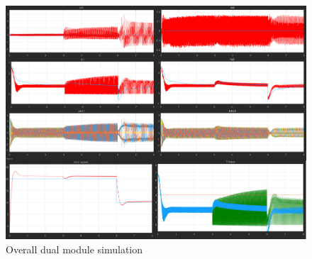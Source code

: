\documentclass{article}
\begin{document}
\begin{figure}[h!]
\centering
\includegraphics[scale=0.3]{Figures/DualModule/Overall.png}
\caption{Overall dual module simulation}
\label{fig:overall_dual}
\end{figure}




\end{document}
